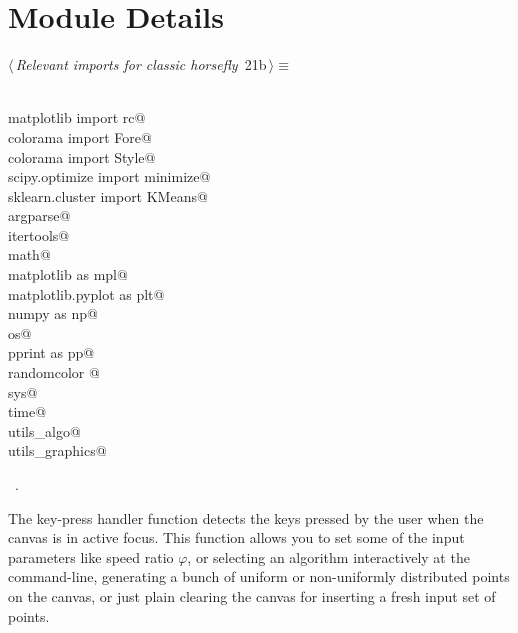 \documentclass[11.5pt]{report}
\begin{document}
\section{Module Details}

\newchunk 
\begin{flushleft} \small\label{scrap12}\raggedright\small
{} $\langle\,${\itshape Relevant imports for classic horsefly}\nobreak\ {\footnotesize {21b}}$\,\rangle\equiv$
\vspace{-1ex}
\begin{list}{}{} \item
\mbox{}\verb@@\\
\mbox{}\verb@from matplotlib import rc@\\
\mbox{}\verb@from colorama import Fore@\\
\mbox{}\verb@from colorama import Style@\\
\mbox{}\verb@from scipy.optimize import minimize@\\
\mbox{}\verb@from sklearn.cluster import KMeans@\\
\mbox{}\verb@import argparse@\\
\mbox{}\verb@import itertools@\\
\mbox{}\verb@import math@\\
\mbox{}\verb@import matplotlib as mpl@\\
\mbox{}\verb@import matplotlib.pyplot as plt@\\
\mbox{}\verb@import numpy as np@\\
\mbox{}\verb@import os@\\
\mbox{}\verb@import pprint as pp@\\
\mbox{}\verb@import randomcolor @\\
\mbox{}\verb@import sys@\\
\mbox{}\verb@import time@\\
\mbox{}\verb@import utils_algo@\\
\mbox{}\verb@import utils_graphics@\\
\mbox{}\verb@@{\NWsep}
\end{list}
\vspace{-1.5ex}
\footnotesize
\begin{list}{}{\setlength{\itemsep}{-\parsep}\setlength{\itemindent}{-\leftmargin}}
\item \NWtxtMacroRefIn\ .

\item{}
\end{list}
\vspace{4ex}
\end{flushleft}
\newchunk The key-press handler function detects the keys pressed by the user when the canvas
is in active focus. This function allows you to set some of the input parameters like 
speed ratio $\varphi$, or selecting an algorithm interactively at the command-line, 
generating a bunch of uniform or non-uniformly distributed points on the canvas, 
or just plain clearing the canvas for inserting a fresh input set of points. 
\end{document}
